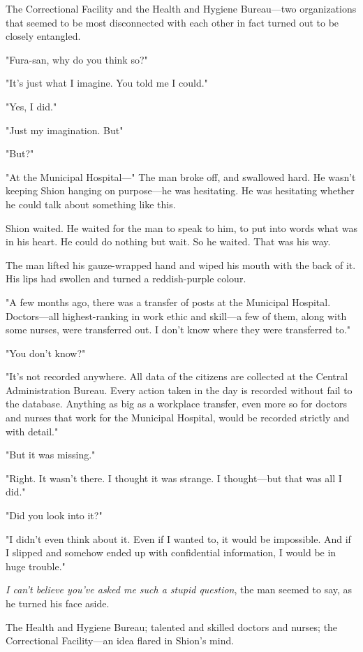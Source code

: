 The Correctional Facility and the Health and Hygiene Bureau---two
organizations that seemed to be most disconnected with each other in
fact turned out to be closely entangled.

"Fura-san, why do you think so?"

"It's just what I imagine. You told me I could."

"Yes, I did."

"Just my imagination. But\el "

"But?"

"At the Municipal Hospital---" The man broke off, and swallowed hard. He
wasn't keeping Shion hanging on purpose---he was hesitating. He was
hesitating whether he could talk about something like this.

Shion waited. He waited for the man to speak to him, to put into words
what was in his heart. He could do nothing but wait. So he waited. That
was his way.

The man lifted his gauze-wrapped hand and wiped his mouth with the back
of it. His lips had swollen and turned a reddish-purple colour.

"A few months ago, there was a transfer of posts at the Municipal
Hospital. Doctors---all highest-ranking in work ethic and skill---a few of
them, along with some nurses, were transferred out. I don't know where
they were transferred to."

"You don't know?"

"It's not recorded anywhere. All data of the citizens are collected at
the Central Administration Bureau. Every action taken in the day is
recorded without fail to the database. Anything as big as a workplace
transfer, even more so for doctors and nurses that work for the
Municipal Hospital, would be recorded strictly and with detail."

"But it was missing."

"Right. It wasn't there. I thought it was strange. I thought---but that
was all I did."

"Did you look into it?"

"I didn't even think about it. Even if I wanted to, it would be
impossible. And if I slipped and somehow ended up with confidential
information, I would be in huge trouble."

\emph{I can't believe you've asked me such a stupid question}, the man seemed
to say, as he turned his face aside.

The Health and Hygiene Bureau; talented and skilled doctors and nurses;
the Correctional Facility---an idea flared in Shion's mind.

